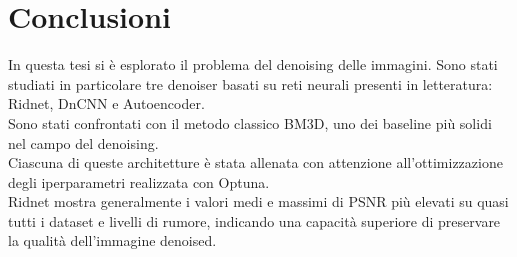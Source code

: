 \documentclass[12pt,a4paper,openright,twoside]{book}
\begin{document}
\section{Conclusioni}
In questa tesi si è esplorato il problema del denoising delle immagini. Sono stati studiati in particolare tre denoiser basati su reti neurali presenti in letteratura: Ridnet, DnCNN e Autoencoder.\\
Sono stati confrontati con il metodo classico BM3D, uno dei baseline più solidi nel campo del denoising.\\
Ciascuna di queste architetture è stata allenata con attenzione all'ottimizzazione degli iperparametri realizzata con Optuna.\\
Ridnet mostra generalmente i valori medi e massimi di PSNR più elevati su quasi tutti i dataset e livelli di rumore, indicando una capacità superiore di preservare la qualità dell'immagine denoised.


%

\printbibliography
%
\end{document}
